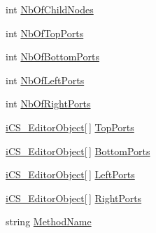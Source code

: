 \begin{DoxyCompactItemize}
int \hyperlink{classi_c_s___editor_object_aa5b466947de2dc029cc4b7dc777c99bc}{Nb\+Of\+Child\+Nodes}
\item 
int \hyperlink{classi_c_s___editor_object_a3f365c395ad0a097d773d35a9804d4f1}{Nb\+Of\+Top\+Ports}
\item 
int \hyperlink{classi_c_s___editor_object_ab0a26ec94fb2447f80d4e08e4bb5e3d1}{Nb\+Of\+Bottom\+Ports}
\item 
int \hyperlink{classi_c_s___editor_object_aeba2e35e439a541b9dc0c65bcc14dc82}{Nb\+Of\+Left\+Ports}
\item 
int \hyperlink{classi_c_s___editor_object_a98e5015fb20baf587350761d6488c88b}{Nb\+Of\+Right\+Ports}
\item 
\hyperlink{classi_c_s___editor_object}{i\+C\+S\+\_\+\+Editor\+Object}\mbox{[}$\,$\mbox{]} \hyperlink{classi_c_s___editor_object_af620a734ce74aff7bf2d755007186712}{Top\+Ports}
\item 
\hyperlink{classi_c_s___editor_object}{i\+C\+S\+\_\+\+Editor\+Object}\mbox{[}$\,$\mbox{]} \hyperlink{classi_c_s___editor_object_a6a319287a786143fa6906b2b2382c10f}{Bottom\+Ports}
\item 
\hyperlink{classi_c_s___editor_object}{i\+C\+S\+\_\+\+Editor\+Object}\mbox{[}$\,$\mbox{]} \hyperlink{classi_c_s___editor_object_a039eb9dd00abe7a6f1da4b46bb405543}{Left\+Ports}
\item 
\hyperlink{classi_c_s___editor_object}{i\+C\+S\+\_\+\+Editor\+Object}\mbox{[}$\,$\mbox{]} \hyperlink{classi_c_s___editor_object_afe1cc4185bd4780986ba9375843b7efb}{Right\+Ports}
\item 
string \hyperlink{classi_c_s___editor_object_aae3da6bd809701bc0d839c7bc41310e0}{Method\+Name}
\item 

\end{DoxyCompactItemize}

